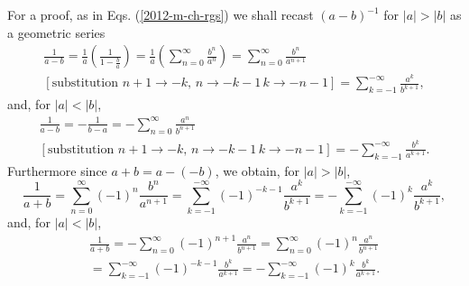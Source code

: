 {\color{OliveGreen}
\bproof

For  a proof,   as in Eqs. (\ref{2012-m-ch-rgs})
we shall recast $(a-b)^{-1}$   for $|a|>|b|$
as a geometric series
\begin{equation}
\begin{split}
\frac{1}{a - b}=
\frac{1}{a} \left(\frac  {1}{1 - \frac{ b }{ a }}\right)
=
\frac{1}{a} \left( \sum_{n=0}^\infty \frac{ b^n }{  a^n }\right)
=
\sum_{n=0}^\infty \frac{ b^n }{  a^{n+1} } \\
[\textrm{substitution }  n+1 \rightarrow -k, \, n \rightarrow -k-1\, k \rightarrow -n-1]
=
\sum_{k=-1}^{-\infty} \frac{ a^k }{  b^{k+1} },
\end{split}
\end{equation}
and, for   $|a|<|b|$,
\begin{equation}
\begin{split}
\frac{1}{a - b}= - \frac{1}{b - a}=
-
\sum_{n=0}^\infty \frac{ a^n }{  b^{n+1} } \\
[\textrm{substitution }  n+1 \rightarrow -k, \, n \rightarrow -k-1\, k \rightarrow -n-1]
=
-
\sum_{k=-1}^{-\infty} \frac{ b^k }{  a^{k+1} }.
\end{split}
\end{equation}
Furthermore since $a+b = a-(-b)$,
we obtain, for $|a|>|b|$,
\begin{equation}
\frac{1}{a + b}
=
\sum_{n=0}^\infty (-1)^n \frac{ b^n }{  a^{n+1} }
=
\sum_{k=-1}^{-\infty}(-1)^{-k-1} \frac{ a^k }{  b^{k+1} }
=
-
\sum_{k=-1}^{-\infty}(-1)^{ k } \frac{ a^k }{  b^{k+1} }
,
\end{equation}
and,  for $|a|<|b|$,
\begin{equation}
\begin{split}
\frac{1}{a + b}
=
-
\sum_{n=0}^\infty (-1)^{n+1} \frac{ a^n }{  b^{n+1} }
=
\sum_{n=0}^\infty (-1)^{n} \frac{ a^n }{  b^{n+1} }  \\
=
\sum_{k=-1}^{-\infty}(-1)^{-k-1} \frac{ b^k }{  a^{k+1} }
=
-
\sum_{k=-1}^{-\infty}(-1)^{ k } \frac{ b^k }{  a^{k+1} }
.
\end{split}
\end{equation}


}
